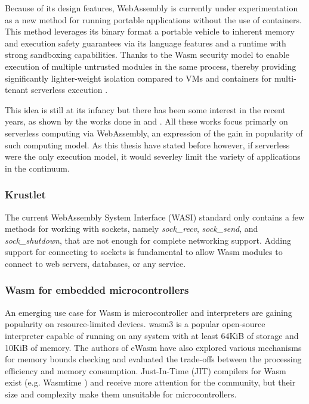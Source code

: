 \documentclass{ieeeaccess}
\begin{document}
Because of its design features, WebAssembly is currently under experimentation as a new method for running portable applications without the use of containers. This method leverages its binary format a portable vehicle to inherent memory and execution safety guarantees via its language features and a runtime with strong sandboxing capabilities. Thanks to the Wasm security model to enable execution of multiple untrusted modules in the same process, thereby providing significantly lighter-weight isolation compared to VMs and containers for multi-tenant serverless execution \cite{sledge}.

This idea is still at its infancy but there has been some interest in the recent years, as shown by the works done in \cite{execution-model-serverless-edge} and \cite{faasm}. All these works focus primarly on serverless computing via WebAssembly, an expression of the gain in popularity of such computing model. As this thesis have stated before however, if serverless were the only execution model, it would severley limit the variety of applications in the continuum.

\subsubsection{Krustlet}

The current WebAssembly System Interface (WASI) standard only contains a few methods for working with sockets, namely \emph{sock\_recv}, \emph{sock\_send}, and \emph{sock\_shutdown}, that are not enough for complete networking support. Adding support for connecting to sockets is fundamental to allow Wasm modules to connect to web servers, databases, or any service.

\subsubsection{Wasm for embedded microcontrollers}

An emerging use case for Wasm is microcontroller and interpreters are gaining popularity on resource-limited devices. wasm3 \cite{wasm3} is a popular open-source interpreter capable of running on any system with at least 64KiB of storage and 10KiB of memory. The authors of eWasm \cite{ewasm} have also explored various mechanisms for memory bounds checking and evaluated the trade-offs between the processing efficiency and memory consumption. Just-In-Time (JIT) compilers for Wasm exist (e.g. Wasmtime \cite{wasmtime}) and receive more attention for the community, but their size and complexity make them unsuitable for microcontrollers.
\end{document}
